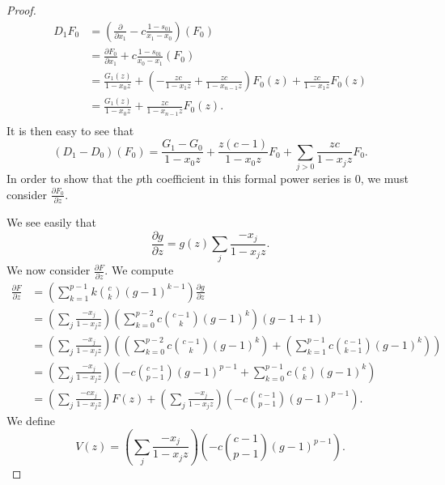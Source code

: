 \documentclass{amsart}
\numberwithin{equation}{section}
\theoremstyle{definition}
\begin{document}
\begin{proof}
\begin{align*}
D_1F_0&=\left(\frac{\partial}{\partial x_1}-c \frac{1-s_{01}}{x_1-x_0}\right)(F_0)\\
&=\frac{\partial F_0}{\partial x_1}+c \frac{1-s_{01}}{x_0-x_1}(F_0)\\
&=\frac{G_1(z)}{1-x_0z}+\left(-\frac{zc}{1-x_1z}+\frac{zc}{1-x_{n-1}z}\right)F_0(z)+\frac{zc}{1-x_1z}F_0(z)\\
&=\frac{G_1(z)}{1-x_0z}+\frac{zc}{1-x_{n-1}z}F_0(z).\\
\end{align*}
It is then easy to see that 
\[
(D_1-D_0)(F_0)=\frac{G_1-G_0}{1-x_0z}+\frac{z(c-1)}{1-x_0z}F_0+\sum_{j>0} \frac{zc}{1-x_jz}F_0.
\]
In order to show that the $p$th coefficient in this formal power series is $0$, we must consider $\frac{\partial F_0}{\partial z}$. 

We see easily that 
\[
\frac{\partial g}{\partial z} = g(z) \sum_j \frac{-x_j}{1-x_jz}.
\]
We now consider $\frac{\partial F}{\partial z}$. We compute
\begin{align*}
\frac{\partial F}{\partial z}%
&=\left(\sum_{k=1}^{p-1}k\binom{c}{k}(g-1)^{k-1}\right)\frac{\partial g}{\partial z}\\
&=\left(\sum_j \frac{-x_j}{1-x_jz}\right)\left(\sum_{k=0}^{p-2}c\binom{c-1}{k}(g-1)^{k}\right)(g-1+1)\\
&=\left(\sum_j \frac{-x_j}{1-x_jz}\right)\left(\left(\sum_{k=0}^{p-2}c\binom{c-1}{k}(g-1)^{k}\right)+\left(\sum_{k=1}^{p-1}c\binom{c-1}{k-1}(g-1)^{k}\right)\right)\\
&=\left(\sum_j \frac{-x_j}{1-x_jz}\right)\left(-c\binom{c-1}{p-1}(g-1)^{p-1}+\sum_{k=0}^{p-1}c\binom{c}{k}(g-1)^{k}\right)\\
&=\left(\sum_j \frac{-cx_j}{1-x_jz}\right)F(z)+\left(\sum_j \frac{-x_j}{1-x_jz}\right)\left(-c\binom{c-1}{p-1}(g-1)^{p-1}\right).
\end{align*}
We define 
\[
V(z)=\left(\sum_j \frac{-x_j}{1-x_jz}\right)\left(-c\binom{c-1}{p-1}(g-1)^{p-1}\right).
\]
\end{proof}
\end{document}
